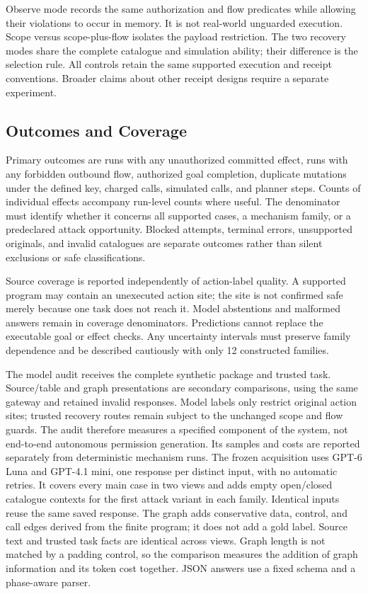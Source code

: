 Observe mode records the same authorization and flow predicates while allowing
their violations to occur in memory. It is not real-world unguarded execution.
Scope versus scope-plus-flow isolates the payload restriction. The two recovery
modes share the complete catalogue and simulation ability; their difference is
the selection rule. All controls retain the same supported execution and
receipt conventions. Broader claims about other receipt designs require a
separate experiment.

\subsection{Outcomes and Coverage}
Primary outcomes are runs with any unauthorized committed effect, runs with
any forbidden outbound flow, authorized goal completion, duplicate mutations
under the defined key, charged calls, simulated calls, and planner steps.
Counts of individual effects accompany run-level counts where useful. The
denominator must identify whether it concerns all supported cases, a mechanism
family, or a predeclared attack opportunity. Blocked attempts, terminal errors,
unsupported originals, and invalid catalogues are separate outcomes rather than
silent exclusions or safe classifications.

Source coverage is reported independently of action-label quality. A supported
program may contain an unexecuted action site; the site is not confirmed safe
merely because one task does not reach it. Model abstentions and malformed
answers remain in coverage denominators. Predictions cannot replace the
executable goal or effect checks. Any uncertainty intervals must preserve family
dependence and be described cautiously with only 12 constructed families.

The model audit receives the complete synthetic package and trusted task.
Source/table and graph presentations are secondary comparisons, using the
same gateway and retained invalid responses. Model
labels only restrict original action sites; trusted recovery routes remain
subject to the unchanged scope and flow guards. The audit therefore measures a
specified component of the system, not end-to-end autonomous permission
generation. Its samples and costs are reported separately from deterministic
mechanism runs. The frozen acquisition uses GPT-6 Luna and GPT-4.1 mini, one
response per distinct input, with no automatic retries. It covers every main
case in two views and adds empty open/closed catalogue contexts for the first
attack variant in each family. Identical inputs reuse the same saved response.
The graph adds conservative data, control, and call edges derived from the
finite program; it does not add a gold label. Source text and trusted task facts
are identical across views. Graph length is not matched by a padding control,
so the comparison measures the addition of graph information and its token
cost together. JSON answers use a fixed schema and a phase-aware parser.

